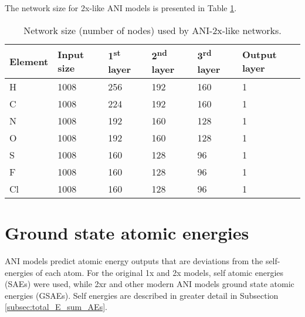 The network size for 2x-like ANI models is presented in Table \ref{tbl:2x_network_size}.

\begin{table}[hb!]
    \caption[ANI-2x-like network shapes]{Network size (number of nodes) used by ANI-2x-like networks.}
    \label{tbl:2x_network_size}
    \begin{tabularx}{\textwidth}{XXXXXX}
    \toprule
    \textbf{Element} & \textbf{Input size}  & \textbf{1\textsuperscript{st} layer}  & \textbf{2\textsuperscript{nd} layer} & \textbf{3\textsuperscript{rd} layer} & \textbf{Output layer}\\
    \midrule
    H & 1008 & 256 & 192 & 160 & 1 \\
    C & 1008 & 224 & 192 & 160 & 1 \\
    N & 1008 & 192 & 160 & 128 & 1 \\
    O & 1008 & 192 & 160 & 128 & 1 \\
    S & 1008 & 160 & 128 & 96 & 1 \\
    F & 1008 & 160 & 128 & 96 & 1 \\
    Cl & 1008 & 160 & 128 & 96 & 1 \\
    \bottomrule
    \end{tabularx}
\end{table}






\chapter{Ground state atomic energies}
\label{appendix:GSAEs}
ANI models predict atomic energy outputs that are deviations from the self-energies of each atom. 
For the original 1x and 2x models, self atomic energies (SAEs) were used, while 2xr and other modern ANI models ground state atomic energies (GSAEs). 
Self energies are described in greater detail in Subsection \ref{subsec:total_E_sum_AEs}.


